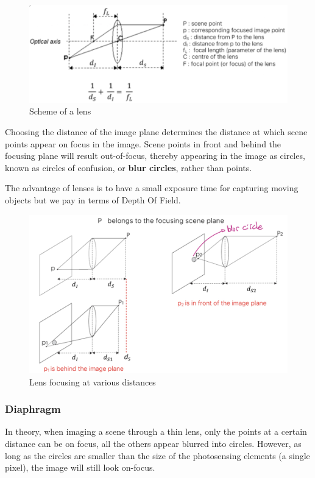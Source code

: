 \documentclass{article}
\begin{document}
\begin{figure}[htbp]
  \centering
  \includegraphics[width=0.7\linewidth]{./img/lens.jpg}
  \caption{Scheme of a lens}
  \label{fig:lens}
\end{figure}

Choosing the distance of the image plane determines the distance at which scene points appear on focus in the image.
Scene points in front and behind the focusing plane will result out-of-focus, thereby appearing in the image as circles, known as circles of confusion, or \textbf{blur circles}, rather than points.

The advantage of lenses is to have a small exposure time for capturing moving objects but we pay in terms of Depth Of Field.

\begin{figure}[htbp]
  \centering
  \includegraphics[width=0.7\linewidth]{./img/lens_focus.jpg}
  \caption{Lens focusing at various distances}
  \label{fig:lens_focus}
\end{figure}

\subsubsection{Diaphragm}

In theory, when imaging a scene through a thin lens, only the points at a certain distance can be on focus, all the others appear blurred into circles.
However, as long as the circles are smaller than the size of the photosensing elements (a single pixel), the image will still look on-focus.
\end{document}
